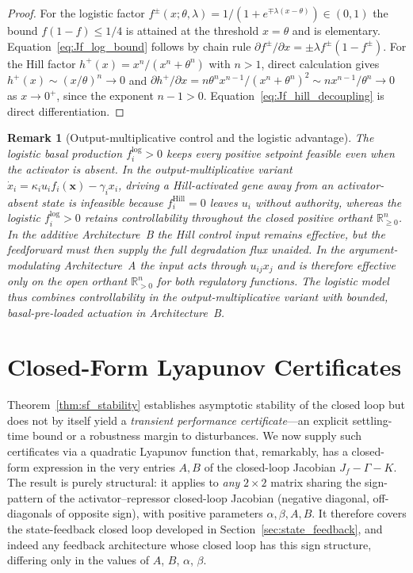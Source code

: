 \documentclass[12pt]{article}
\newtheorem{remark}{Remark}
\begin{document}
\begin{proof}
For the logistic factor $f^\pm(x;\theta,\lambda)=1/(1+e^{\mp\lambda(x-\theta)})\in(0,1)$
the bound $f(1-f)\leq 1/4$ is attained at the threshold $x=\theta$ and is
elementary. Equation~\eqref{eq:Jf_log_bound} follows by chain rule
$\partial f^\pm/\partial x = \pm \lambda f^\pm(1-f^\pm)$. For the Hill
factor $h^+(x)=x^n/(x^n+\theta^n)$ with $n>1$, direct calculation gives
$h^+(x)\sim (x/\theta)^n\to 0$ and
$\partial h^+/\partial x = n\theta^n x^{n-1}/(x^n+\theta^n)^2\sim
n x^{n-1}/\theta^n \to 0$ as $x\to 0^+$, since the exponent $n-1>0$.
Equation~\eqref{eq:Jf_hill_decoupling} is direct differentiation.
\end{proof}

\begin{remark}[Output-multiplicative control and the logistic advantage]
The logistic basal production $f_i^{\mathrm{log}}>0$ keeps every positive
setpoint feasible even when the activator is absent. In the
output-multiplicative variant $\dot{x}_i=\kappa_i u_i f_i(\mathbf{x})
-\gamma_i x_i$, driving a Hill-activated gene away from an activator-absent
state is infeasible because $f_i^{\mathrm{Hill}}=0$ leaves $u_i$ without
authority, whereas the logistic $f_i^{\mathrm{log}}>0$ retains
controllability throughout the closed positive orthant
$\mathbb{R}_{\geq 0}^n$. In the additive Architecture~B the Hill control
input remains effective, but the feedforward must then supply the full
degradation flux unaided. In the argument-modulating Architecture~A the
input acts through $u_{ij}x_j$ and is therefore effective only on the open
orthant $\mathbb{R}_{>0}^n$ for \emph{both} regulatory functions. The
logistic model thus combines controllability in the output-multiplicative
variant with bounded, basal-pre-loaded actuation in Architecture~B.
\end{remark}

\section{Closed-Form Lyapunov Certificates}
\label{sec:lyapunov}

Theorem~\ref{thm:sf_stability} establishes asymptotic stability of the
closed loop but does not by itself yield a \emph{transient performance
certificate}---an explicit settling-time bound or a robustness margin to
disturbances. We now supply such certificates via a quadratic Lyapunov
function that, remarkably, has a closed-form expression in the very
entries $A,B$ of the closed-loop Jacobian $J_f-\Gamma-K$. The result is
purely structural: it applies to \emph{any} $2\times 2$ matrix sharing
the sign-pattern of the activator--repressor closed-loop Jacobian
(negative diagonal, off-diagonals of opposite sign), with positive
parameters $\alpha,\beta,A,B$. It therefore covers the
state-feedback closed loop developed in
Section~\ref{sec:state_feedback}, and indeed any feedback architecture
whose closed loop has this sign structure, differing only in the values
of $A$, $B$, $\alpha$, $\beta$.
\end{document}
